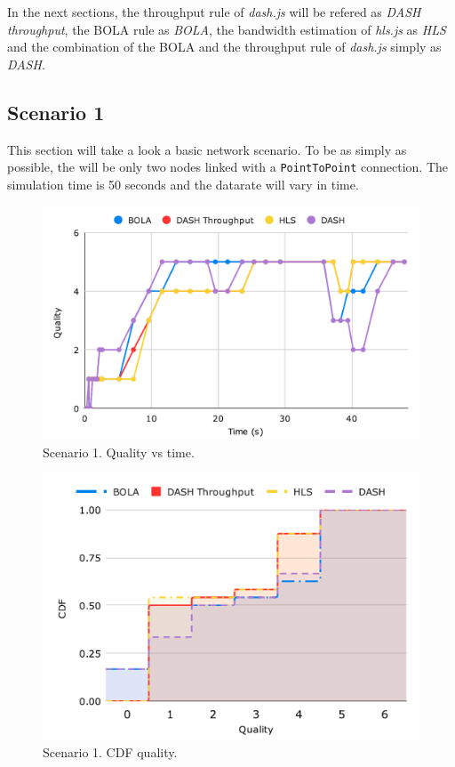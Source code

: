In the next sections, the throughput rule of \textit{dash.js} will be refered as \textit{DASH throughput},
the BOLA rule as \textit{BOLA}, the bandwidth estimation of \textit{hls.js} as \textit{HLS} and the combination
of the BOLA and the throughput rule of \textit{dash.js} simply as \textit{DASH}.

\subsection{Scenario 1}
This section will take a look a basic network scenario. To be as simply as possible, the will be 
only two nodes linked with a \texttt{PointToPoint} connection. The simulation time is 50 seconds 
and the datarate will vary in time.

\begin{figure}[]
    \centering
    \includegraphics[width=\textwidth]{img/s1c1.pdf}
    \caption{Scenario 1. Quality vs time.}
    \label{fig:s1c1}
\end{figure}

\begin{figure}[]
    \centering
    \includegraphics[width=\textwidth]{img/s1c2.pdf}
    \caption{Scenario 1. CDF quality.}
    \label{fig:s1c2}
\end{figure}


